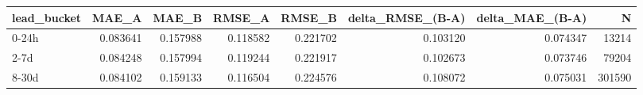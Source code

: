 \begin{tabular}{lrrrrrrr}
\toprule
lead_bucket & MAE_A & MAE_B & RMSE_A & RMSE_B & delta_RMSE_(B-A) & delta_MAE_(B-A) & N \\
\midrule
0-24h & 0.083641 & 0.157988 & 0.118582 & 0.221702 & 0.103120 & 0.074347 & 13214 \\
2-7d & 0.084248 & 0.157994 & 0.119244 & 0.221917 & 0.102673 & 0.073746 & 79204 \\
8-30d & 0.084102 & 0.159133 & 0.116504 & 0.224576 & 0.108072 & 0.075031 & 301590 \\
\bottomrule
\end{tabular}
